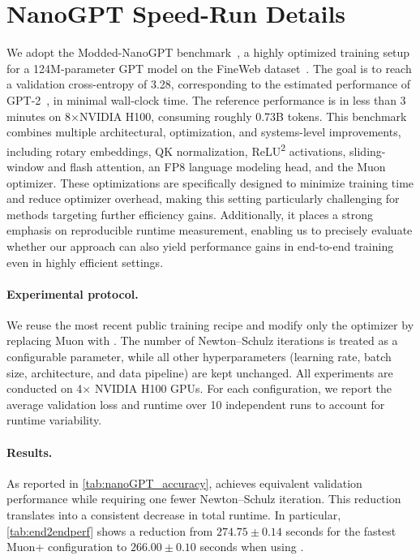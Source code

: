 \section{NanoGPT Speed-Run Details}
\label{ap:nanogpt-WR}

We adopt the Modded-NanoGPT benchmark~\cite{modded_nanogpt_2024}, a highly optimized training setup for a 124M-parameter GPT model on the FineWeb dataset~\cite{penedo2024fineweb}. The goal is to reach a validation cross-entropy of 3.28, corresponding to the estimated performance of GPT-2~\cite{radford2019language}, in minimal wall-clock time. The reference performance is in less than 3 minutes on 8×NVIDIA H100, consuming roughly 0.73B tokens.
This benchmark combines multiple architectural, optimization, and systems-level improvements, including rotary embeddings, QK normalization, ReLU\textsuperscript{2} activations, sliding-window and flash attention, an FP8 language modeling head, and the Muon optimizer. These optimizations are specifically designed to minimize training time and reduce optimizer overhead, making this setting particularly challenging for methods targeting further efficiency gains. Additionally, it places a strong emphasis on reproducible runtime measurement, enabling us to precisely evaluate whether our approach can also yield performance gains in end-to-end training even in highly efficient settings. 
\paragraph{Experimental protocol.} We reuse the most recent public training recipe and modify only the optimizer by replacing Muon with \turbomuon. The number of Newton--Schulz iterations is treated as a configurable parameter, while all other hyperparameters (learning rate, batch size, architecture, and data pipeline) are kept unchanged.
All experiments are conducted on 4$\times$ NVIDIA H100 GPUs. For each configuration, we report the average validation loss and runtime over 10 independent runs to account for runtime variability.
\paragraph{Results.}
As reported in \cref{tab:nanoGPT_accuracy}, \turbomuon achieves equivalent validation performance while requiring one fewer Newton--Schulz iteration. This reduction translates into a consistent decrease in total runtime. In particular, \cref{tab:end2endperf} shows a reduction from $274.75 \pm 0.14$ seconds for the fastest Muon+ configuration to $266.00 \pm 0.10$ seconds when using \turbomuon.

